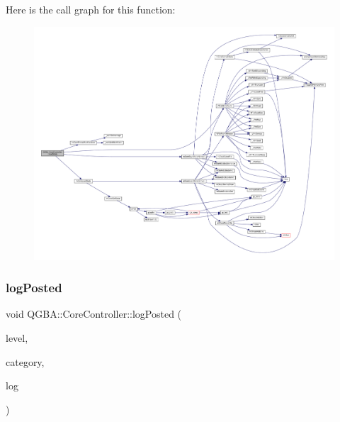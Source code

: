Here is the call graph for this function\+:
\nopagebreak
\begin{figure}[H]
\begin{center}
\leavevmode
\includegraphics[width=350pt]{class_q_g_b_a_1_1_core_controller_ab568b1cb1680fcce174e54eebde22381_cgraph}
\end{center}
\end{figure}
\mbox{\label{class_q_g_b_a_1_1_core_controller_a7fd83cd7f60584e9071da1fd9043c0f6}} 
\subsubsection{\texorpdfstring{log\+Posted}{logPosted}}
{\footnotesize\ttfamily void Q\+G\+B\+A\+::\+Core\+Controller\+::log\+Posted (\begin{DoxyParamCaption}\item[{\mbox{\hyperlink{ioapi_8h_a787fa3cf048117ba7123753c1e74fcd6}{int}}}]{level,  }\item[{\mbox{\hyperlink{ioapi_8h_a787fa3cf048117ba7123753c1e74fcd6}{int}}}]{category,  }\item[{const Q\+String \&}]{log }\end{DoxyParamCaption})\hspace{0.3cm}{\ttfamily [signal]}}

